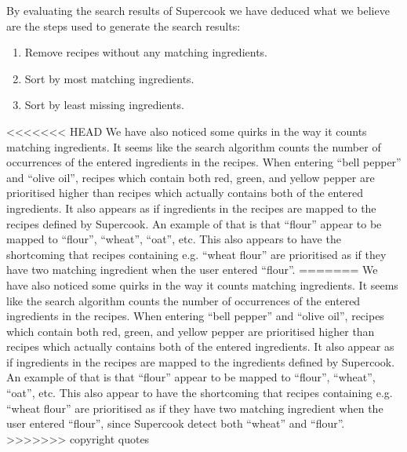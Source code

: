By evaluating the search results of Supercook we have deduced what we believe are the steps used to generate the search results:
\begin{enumerate}
	\item Remove recipes without any matching ingredients.
	\item Sort by most matching ingredients.
	\item Sort by least missing ingredients.
\end{enumerate}
<<<<<<< HEAD
We have also noticed some quirks in the way it counts matching ingredients. It seems like the search algorithm counts the number of occurrences of the entered ingredients in the recipes. When entering ``bell pepper'' and ``olive oil'', recipes which contain both red, green, and yellow pepper are prioritised higher than recipes which actually contains both of the entered ingredients. It also appears as if ingredients in the recipes are mapped to the recipes defined by Supercook. An example of that is that ``flour'' appear to be mapped to ``flour'', ``wheat'', ``oat'', etc. This also appears to have the shortcoming that recipes containing e.g. ``wheat flour'' are prioritised as if they have two matching ingredient when the user entered ``flour''.
=======
We have also noticed some quirks in the way it counts matching ingredients. It seems like the search algorithm counts the number of occurrences of the entered ingredients in the recipes. When entering ``bell pepper'' and ``olive oil'', recipes which contain both red, green, and yellow pepper are prioritised higher than recipes which actually contains both of the entered ingredients. It also appear as if ingredients in the recipes are mapped to the ingredients defined by Supercook. An example of that is that ``flour'' appear to be mapped to ``flour'', ``wheat'', ``oat'', etc. This also appear to have the shortcoming that recipes containing e.g. ``wheat flour'' are prioritised as if they have two matching ingredient when the user entered ``flour'', since Supercook detect both ``wheat'' and ``flour''.
>>>>>>> copyright quotes

